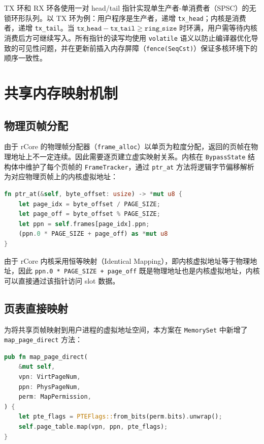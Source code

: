 TX 环和 RX 环各使用一对 head/tail 指针实现单生产者-单消费者（SPSC）的无锁环形队列。以 TX 环为例：用户程序是生产者，递增 \texttt{tx\_head}；内核是消费者，递增 \texttt{tx\_tail}。当 $\texttt{tx\_head} - \texttt{tx\_tail} \geq \texttt{ring\_size}$ 时环满，用户需等待内核消费后方可继续写入。所有指针的读写均使用 \texttt{volatile} 语义以防止编译器优化导致的可见性问题，并在更新前插入内存屏障（\texttt{fence(SeqCst)}）保证多核环境下的顺序一致性。

\section{共享内存映射机制}

\subsection{物理页帧分配}

由于 rCore 的物理帧分配器（\texttt{frame\_alloc}）以单页为粒度分配，返回的页帧在物理地址上不一定连续。因此需要逐页建立虚实映射关系。内核在 \texttt{BypassState} 结构体中维护了每个页帧的 \texttt{FrameTracker}，通过 \texttt{ptr\_at} 方法将逻辑字节偏移解析为对应物理页帧上的内核虚拟地址：

\begin{lstlisting}[language=Rust, caption={非连续物理页的地址解析}]
fn ptr_at(&self, byte_offset: usize) -> *mut u8 {
    let page_idx = byte_offset / PAGE_SIZE;
    let page_off = byte_offset % PAGE_SIZE;
    let ppn = self.frames[page_idx].ppn;
    (ppn.0 * PAGE_SIZE + page_off) as *mut u8
}
\end{lstlisting}

由于 rCore 内核采用恒等映射（Identical Mapping），即内核虚拟地址等于物理地址，因此 \texttt{ppn.0 * PAGE\_SIZE + page\_off} 既是物理地址也是内核虚拟地址，内核可以直接通过该指针访问 slot 数据。

\subsection{页表直接映射}

为将共享页帧映射到用户进程的虚拟地址空间，本方案在 \texttt{MemorySet} 中新增了 \texttt{map\_page\_direct} 方法：

\begin{lstlisting}[language=Rust, caption={页表直接映射方法}]
pub fn map_page_direct(
    &mut self,
    vpn: VirtPageNum,
    ppn: PhysPageNum,
    perm: MapPermission,
) {
    let pte_flags = PTEFlags::from_bits(perm.bits).unwrap();
    self.page_table.map(vpn, ppn, pte_flags);
}
\end{lstlisting}

